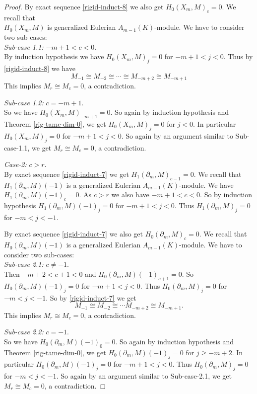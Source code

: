 \documentclass{amsart}
\theoremstyle{plain}
\theoremstyle{definition}
\theoremstyle{remark}
\begin{document}
\begin{proof}
 By exact sequence  \ref{rigid-induct-8} we also  get  $H_0(X_m, M)_{c} = 0$.  We recall that 
 \\ $H_0(X_m, M)$ is generalized Eulerian $A_{m-1}(K)$-module. 
 We have to consider two sub-cases:\\
 \textit{Sub-case 1.1:}  $-m+1 < c < 0$. \\
 By induction hypothesis we have $H_0(X_m, M)_j = 0 $ for $-m+1 < j < 0$.
 Thus by \ref{rigid-induct-8} we have
 \[
  M_{-1} \cong M_{-2} \cong \cdots \cong M_{-m + 2} \cong M_{-m + 1}
 \]
This implies $M_r \cong M_c = 0$, a contradiction.

\textit{Sub-case 1.2:}  $c = -m+1 $. \\
So we have $H_0(X_m, M)_{-m +1} = 0$. So again by induction hypothesis  and Theorem \ref{rig-tame-dim-0}, we get 
$H_0(X_m, M)_j = 0 $ for $j < 0$. In particular $H_0(X_m, M)_j = 0 $ for $-m+1 < j < 0$. So again  by an argument similar to
Sub-case-1.1, we get $M_r \cong M_c = 0$, a contradiction.

\textit{Case-2:} $c > r$. \\
 By exact sequence \ref{rigid-induct-7} we get  $H_1(\partial_m, M)_{c-1} = 0$. 
 We recall that  \\ $H_1(\partial_m, M)(-1)$ is a generalized Eulerian $A_{m-1}(K)$-module. 
 We have  \\ $H_1(\partial_m, M)(-1)_{c} = 0$. As $c > r$ we also have $-m + 1 < c < 0$.
  So by induction hypothesis $H_1(\partial_m, M)(-1)_{j} = 0$
 for $-m+1 < j < 0$. Thus $H_1(\partial_m, M)_j = 0$ for $ -m < j < -1$.
 
 By exact sequence  \ref{rigid-induct-7} we also  get  $H_0(\partial_m, M)_{c} = 0$.  We recall that 
 \\ $H_0(\partial_m, M)(-1)$ is  a generalized Eulerian $A_{m-1}(K)$-module. 
 We have to consider two sub-cases:\\
 \textit{Sub-case 2.1:}  $c \neq -1$. \\
 Then $-m + 2 < c+ 1 < 0$ and $H_0(\partial_m, M)(-1)_{c+1} = 0$. So $H_0(\partial_m, M)(-1)_{j} = 0$
 for $-m+1 < j < 0$. Thus $H_0(\partial_m, M)_j = 0$ for $ -m < j < -1$.
So by \ref{rigid-induct-7} we get
\[
M_{-1} \cong M_{-2} \cong \cdots M_{-m+2} \cong M_{-m+1}.
\]
This implies $M_r \cong M_c = 0$, a contradiction.

\textit{Sub-case 2.2:}  $c = -1 $. \\
So we have $H_0(\partial_m, M)(-1)_0 = 0$. So again by induction hypothesis  and Theorem \ref{rig-tame-dim-0}, we get 
$H_0(\partial_m, M)(-1)_j = 0 $ for $j \geq - m + 2$. In particular $H_0(\partial_m, M)(-1)_j = 0 $ for $-m+1 < j < 0$.
Thus $H_0(\partial_m, M)_j = 0$ for $ -m < j < -1$.
 So again  by an argument similar to
Sub-case-2.1, we get $M_r \cong M_c = 0$, a contradiction.
\end{proof}
\end{document}
